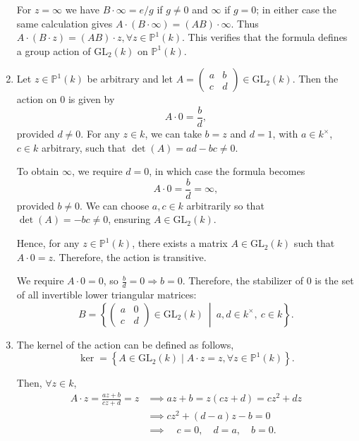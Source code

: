 \documentclass[12pt]{article}
\begin{document}
\begin{enumerate}[label=(\arabic*)]
For \(z=\infty\) we have \(B\cdot\infty = e/g\) if \(g\neq0\) and \(\infty\) if \(g=0\);
in either case the same calculation gives \(A\cdot(B\cdot\infty)=(AB)\cdot\infty\). Thus \(A\cdot(B\cdot z)=(AB)\cdot z, \forall z\in\mathbb P^{1}(k)\). This verifies that the
formula defines a group action of \(\mathrm{GL}_2(k)\) on \(\mathbb{P}^1(k)\).
\item

Let \( z \in \mathbb{P}^1(k) \) be arbitrary and let
\(
A = \begin{pmatrix} a & b \\ c & d \end{pmatrix} \in \mathrm{GL}_2(k).
\)
Then the action on \( 0 \) is given by
\[
A \cdot 0 = \frac{b}{d},
\]
provided \( d \neq 0 \). For any \( z \in k \), we can take \( b = z \) and \( d = 1 \), with \( a \in k^\times \), \( c \in k \) arbitrary, such that \( \det(A) = ad - bc \neq 0 \).

To obtain \( \infty \), we require \( d = 0 \), in which case the formula becomes
\[
A \cdot 0 = \frac{b}{d} = \infty,
\]
provided \( b \neq 0 \). We can choose \( a, c \in k \) arbitrarily so that \( \det(A) = -bc \neq 0 \), ensuring \( A \in \mathrm{GL}_2(k) \).

Hence, for any \( z \in \mathbb{P}^1(k) \), there exists a matrix \( A \in \mathrm{GL}_2(k) \) such that \( A \cdot 0 = z \). Therefore, the action is transitive.

We require \( A \cdot 0 = 0 \), so \( \frac{b}{d} = 0 \Rightarrow b = 0 \). Therefore, the stabilizer of 0 is the set of all invertible lower triangular matrices:
\[
B = \left\{ \begin{pmatrix} a & 0 \\ c & d \end{pmatrix} \in \mathrm{GL}_2(k) \ \middle| \ a, d \in k^\times, \ c \in k \right\}.
\]

\item

The kernel of the action can be defined as follows,
\[
\ker = \left\{ A \in \mathrm{GL}_2(k) \mid A \cdot z = z, \forall z \in \mathbb{P}^1(k) \right\}.
\]

Then, \(\forall z \in k \),
\begin{align*}
A \cdot z = \frac{az + b}{cz + d} = z &\implies az + b = z(cz + d) = cz^2 + dz \\
&\implies cz^2 + (d - a)z - b = 0 \\
&\implies \quad c = 0, \quad d = a, \quad b = 0.
\end{align*}


\end{enumerate}
\end{document}
